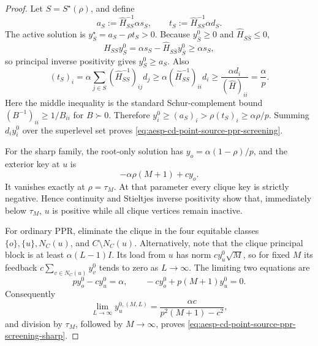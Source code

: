 \begin{proof}
Let \(S=S^\star(\rho)\), and define
\begin{equation*}
 a_S:=\widehat H_{SS}^{-1}\alpha s_S,
 \qquad
 t_S:=\widehat H_{SS}^{-1}\alpha d_S.
\end{equation*}
The active solution is \(y_S^\star=a_S-\rho t_S>0\).  Because
\(y^0_{\bar S}\geq0\) and \(\widehat H_{S\bar S}\leq0\),
\begin{equation*}
 \widehat H_{SS}y_S^0
 =\alpha s_S-\widehat H_{S\bar S}y_{\bar S}^0
 \geq\alpha s_S,
\end{equation*}
so principal inverse positivity gives \(y_S^0\geq a_S\).  Also
\begin{equation*}
 (t_S)_i
 =\alpha\sum_{j\in S}
   (\widehat H_{SS}^{-1})_{ij}d_j
 \geq\alpha(\widehat H_{SS}^{-1})_{ii}d_i
 \geq\frac{\alpha d_i}{(\widehat H)_{ii}}
 =\frac{\alpha}{p}.
\end{equation*}
Here the middle inequality is the standard Schur-complement bound
\((B^{-1})_{ii}\geq1/B_{ii}\) for \(B\succ0\).
Therefore \(y_i^0\geq(a_S)_i>\rho(t_S)_i\geq\alpha\rho/p\).
Summing \(d_i y_i^0\) over the superlevel set proves
\cref{eq:aesp-cd-point-source-ppr-screening}.

For the sharp family, the root-only solution has
\(y_o=\alpha(1-\rho)/p\), and the exterior key at \(u\) is
\begin{equation*}
 -\alpha\rho(M+1)+cy_o.
\end{equation*}
It vanishes exactly at \(\rho=\tau_M\).  At that parameter every clique key
is strictly negative.  Hence continuity and Stieltjes inverse positivity
show that, immediately below \(\tau_M\), \(u\) is positive while all clique
vertices remain inactive.

For ordinary PPR, eliminate the clique in the four equitable classes
\(\{o\},\{u\},N_C(u)\), and \(C\setminus N_C(u)\).  Alternatively, note that
the clique principal block is at least \(\alpha(L-1)I\).  Its load from \(u\)
has norm \(c y_u^0\sqrt M\), so for fixed \(M\) its feedback
\(c\sum_{v\in N_C(u)}y_v^0\) tends to zero as \(L\to\infty\).  The limiting
two equations are
\begin{equation*}
 py_o^0-cy_u^0=\alpha,
 \qquad
 -cy_o^0+p(M+1)y_u^0=0.
\end{equation*}
Consequently
\begin{equation*}
 \lim_{L\to\infty}y_u^{0,(M,L)}
 =\frac{\alpha c}{p^2(M+1)-c^2},
\end{equation*}
and division by \(\tau_M\), followed by \(M\to\infty\), proves
\cref{eq:aesp-cd-point-source-ppr-screening-sharp}.
\end{proof}

